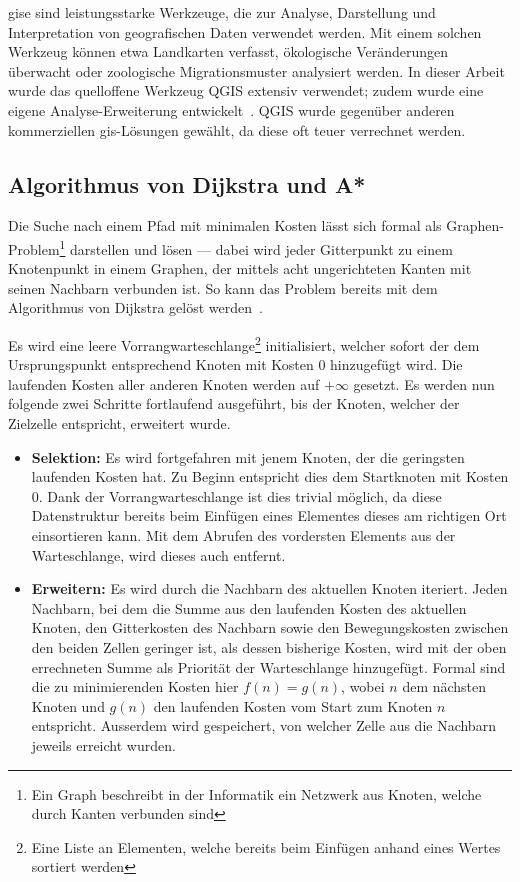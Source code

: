 \gls{gis}e sind leistungsstarke Werkzeuge, die zur Analyse, Darstellung und Interpretation von geografischen Daten verwendet werden. Mit einem solchen Werkzeug können etwa Landkarten verfasst, ökologische Veränderungen überwacht oder zoologische Migrationsmuster analysiert werden.
In dieser Arbeit wurde das quelloffene Werkzeug QGIS extensiv verwendet; zudem wurde eine eigene Analyse-Erweiterung entwickelt~\cite{qgis}. QGIS wurde gegenüber anderen kommerziellen \gls{gis}-Lösungen gewählt, da diese oft teuer verrechnet werden.

\subsection{Algorithmus von Dijkstra und A*}

Die Suche nach einem Pfad mit minimalen Kosten lässt sich formal als Graphen-Problem\footnote{Ein Graph beschreibt in der Informatik ein Netzwerk aus Knoten, welche durch Kanten verbunden sind} darstellen und lösen --- dabei wird jeder Gitterpunkt zu einem Knotenpunkt in einem Graphen, der mittels acht ungerichteten Kanten mit seinen Nachbarn verbunden ist. So kann das Problem bereits mit dem Algorithmus von Dijkstra gelöst werden~\cite{dijkstra1959note}.

Es wird eine leere Vorrangwarteschlange\footnote{Eine Liste an Elementen, welche bereits beim Einfügen anhand eines Wertes sortiert werden} initialisiert, welcher sofort der dem Ursprungspunkt entsprechend Knoten mit Kosten 0 hinzugefügt wird. Die laufenden Kosten aller anderen Knoten werden auf $+ \infty$ gesetzt. Es werden nun  folgende zwei Schritte fortlaufend ausgeführt, bis der Knoten, welcher der Zielzelle entspricht, erweitert wurde.~\cite{dijkstra1959note}
\begin{itemize}
  \item \textbf{Selektion:} Es wird fortgefahren mit jenem Knoten, der die geringsten laufenden Kosten hat. Zu Beginn entspricht dies dem Startknoten mit Kosten 0. Dank der Vorrangwarteschlange ist dies trivial möglich, da diese Datenstruktur bereits beim Einfügen eines Elementes dieses am richtigen Ort einsortieren kann. Mit dem Abrufen des vordersten Elements aus der Warteschlange, wird dieses auch entfernt.~\cite{dijkstra1959note}
  \item \textbf{Erweitern:} Es wird durch die Nachbarn des aktuellen Knoten iteriert. Jeden Nachbarn, bei dem die Summe aus den laufenden Kosten des aktuellen Knoten, den Gitterkosten des Nachbarn sowie den Bewegungskosten zwischen den beiden Zellen geringer ist, als dessen bisherige Kosten, wird mit der oben errechneten Summe als Priorität der Warteschlange hinzugefügt. Formal sind die zu minimierenden Kosten hier $f(n)=g(n)$, wobei $n$ dem nächsten Knoten und $g(n)$ den laufenden Kosten vom Start zum Knoten $n$ entspricht. Ausserdem wird gespeichert, von welcher Zelle aus die Nachbarn jeweils erreicht wurden.~\cite{dijkstra1959note}
\end{itemize}

